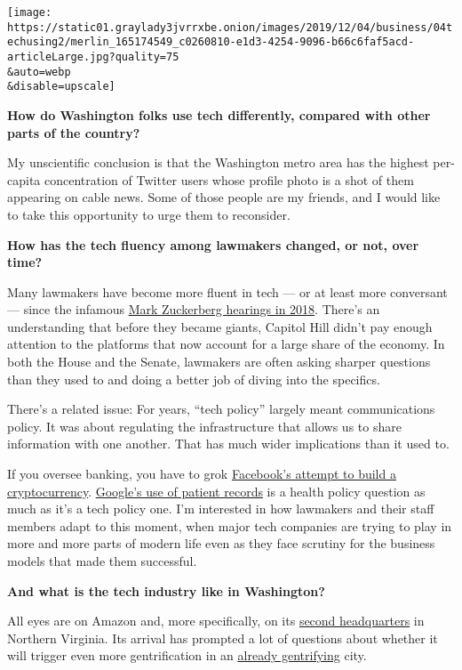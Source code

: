 \texttt{[image: https://static01.graylady3jvrrxbe.onion/images/2019/12/04/business/04techusing2/merlin\_165174549\_c0260810-e1d3-4254-9096-b66c6faf5acd-articleLarge.jpg?quality=75\\\&auto=webp\\\&disable=upscale]}

\textbf{How do Washington folks use tech differently, compared with
other parts of the country?}

My unscientific conclusion is that the Washington metro area has the
highest per-capita concentration of Twitter users whose profile photo is
a shot of them appearing on cable news. Some of those people are my
friends, and I would like to take this opportunity to urge them to
reconsider.

\textbf{How has the tech fluency among lawmakers changed, or not, over
time?}

Many lawmakers have become more fluent in tech --- or at least more
conversant --- since the infamous
\href{https://www.nytimes3xbfgragh.onion/2018/04/10/us/politics/zuckerberg-facebook-senate-hearing.html}{Mark
Zuckerberg hearings in 2018}. There's an understanding that before they
became giants, Capitol Hill didn't pay enough attention to the platforms
that now account for a large share of the economy. In both the House and
the Senate, lawmakers are often asking sharper questions than they used
to and doing a better job of diving into the specifics.

There's a related issue: For years, ``tech policy'' largely meant
communications policy. It was about regulating the infrastructure that
allows us to share information with one another. That has much wider
implications than it used to.

If you oversee banking, you have to grok
\href{https://www.nytimes3xbfgragh.onion/2019/10/11/technology/facebook-libra-partners.html}{Facebook's
attempt to build a cryptocurrency}.
\href{https://www.nytimes3xbfgragh.onion/2019/11/11/business/google-ascension-health-data.html}{Google's
use of patient records} is a health policy question as much as it's a
tech policy one. I'm interested in how lawmakers and their staff members
adapt to this moment, when major tech companies are trying to play in
more and more parts of modern life even as they face scrutiny for the
business models that made them successful.

\textbf{And what is the tech industry like in Washington?}

All eyes are on Amazon and, more specifically, on its
\href{https://www.nytimes3xbfgragh.onion/2018/11/13/business/national-landing-amazon-va.html}{second
headquarters} in Northern Virginia. Its arrival has prompted a lot of
questions about whether it will trigger even more gentrification in an
\href{https://dcist.com/story/19/03/19/d-c-has-had-the-most-gentrifying-neighborhoods-in-the-country-study-finds/}{already
gentrifying} city.

